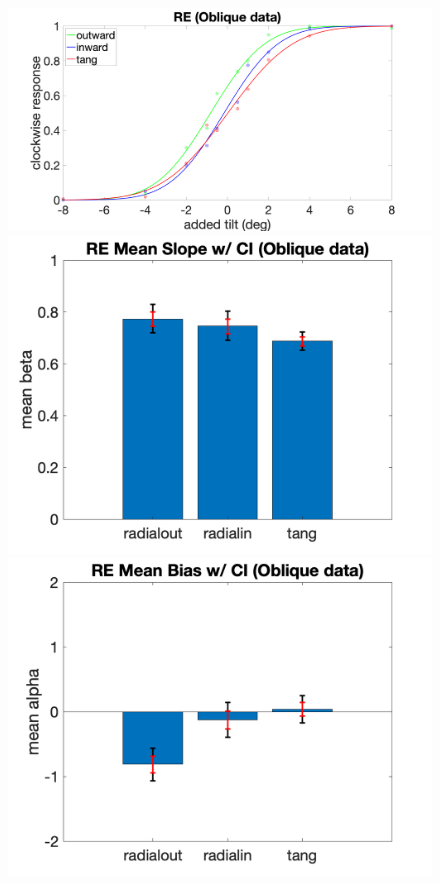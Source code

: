 \documentclass[11pt]{article} %
\begin{document}
\begin{figure}[H]
\includegraphics[scale=.06]{Images/PF_RE_oblique.png}
\includegraphics[scale=.11]{Images/MeanSlopeError_ci_RE_oblique.png}
\includegraphics[scale=.11]{Images/MeanBiasError_ci_RE_oblique.png}

\end{figure}
\end{document}
